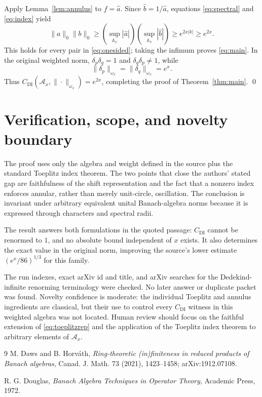 \documentclass[11pt]{article}
\newcommand{\A}{\mathcal A}
\newcommand{\DI}{C_{\mathrm{DI}}}
\begin{document}
Apply Lemma~\ref{lem:annulus} to $f=\widehat a$.  Since
$\widehat b=1/\widehat a$, equations \eqref{eq:spectral} and
\eqref{eq:index} yield
\[
 \|a\|_0\|b\|_0
 \ge\left(\sup_{\mathbb A_x}|\widehat a|\right)
      \left(\sup_{\mathbb A_x}|\widehat b|\right)
 \ge e^{2x|k|}\ge e^{2x}.
\]
This holds for every pair in \eqref{eq:onesided}; taking the infimum proves
\eqref{eq:main}.  In the original weighted norm,
$\delta_p\delta_q=1$ and $\delta_q\delta_p\ne1$, while
\[
 \|\delta_p\|_{\omega_x}=\|\delta_q\|_{\omega_x}=e^x.
\]
Thus $\DI(\A_x,\|\cdot\|_{\omega_x})=e^{2x}$, completing the proof of
Theorem~\ref{thm:main}. \qed

\section{Verification, scope, and novelty boundary}

The proof uses only the algebra and weight defined in the source plus the
standard Toeplitz index theorem.  The two points that close the authors'
stated gap are faithfulness of the shift representation and the fact that a
nonzero index enforces annular, rather than merely unit-circle, oscillation.
The conclusion is invariant under arbitrary equivalent unital
Banach-algebra norms because it is expressed through characters and spectral
radii.

The result answers both formulations in the quoted passage: $\DI$ cannot be
renormed to $1$, and no absolute bound independent of $x$ exists.  It also
determines the exact value in the original norm, improving the source's lower
estimate $(e^x/86)^{1/3}$ for this family.

The run indexes, exact arXiv id and title, and arXiv searches for the
Dedekind-infinite renorming terminology were checked.  No later answer or
duplicate packet was found.  Novelty confidence is moderate: the individual
Toeplitz and annulus ingredients are classical, but their use to control
every $\DI$ witness in this weighted algebra was not located.  Human review
should focus on the faithful extension of \eqref{eq:toeplitzrep} and the
application of the Toeplitz index theorem to arbitrary elements of $\A_x$.

\begin{thebibliography}{9}
M. Daws and B. Horv\'ath,
\emph{Ring-theoretic (in)finiteness in reduced products of Banach algebras},
Canad. J. Math. 73 (2021), 1423--1458; arXiv:1912.07108.

R. G. Douglas,
\emph{Banach Algebra Techniques in Operator Theory},
Academic Press, 1972.
\end{thebibliography}
\end{document}
